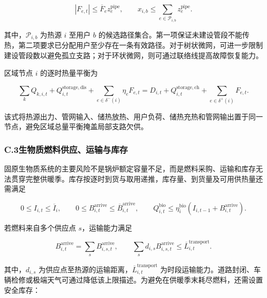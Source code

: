 \begin{equation}
|F_{e,t}|\leq\overline F_ez_e^{\mathrm{pipe}},
\qquad
x_{i,b}\leq\sum_{e\in\mathcal P_{i,b}}z_e^{\mathrm{pipe}}.
\label{eq:guyuan_connectivity}
\end{equation}

其中，$\mathcal P_{i,b}$ 为热源 $i$ 至用户 $b$ 的候选路径集合。第一项保证未建设管段不能传热，第二项要求已分配用户至少存在一条有效路径。对于树状微网，可进一步限制建设管段数以避免孤立支路；对于环状微网，则可通过联络线提高故障恢复能力。

区域节点 $i$ 的逐时热量平衡为

\begin{equation}
\sum_kQ_{k,i,t}+Q_{i,t}^{\mathrm{storage,dis}}
+\sum_{e\in\delta^-(i)}\eta_eF_{e,t}
=D_{i,t}+Q_{i,t}^{\mathrm{storage,ch}}+\sum_{e\in\delta^+(i)}F_{e,t}.
\label{eq:guyuan_node_balance}
\end{equation}

该式将热源出力、管网输入、储热放热、用户负荷、储热充热和管网输出置于同一节点，避免区域总量平衡掩盖局部支路欠供。

\subsubsection*{C.3\quad 生物质燃料供应、运输与库存}

固原生物质系统的主要风险不是锅炉额定容量不足，而是燃料采购、运输和库存无法贯穿完整供暖季。库存按逐时到货与取用递推，库存量、到货量及可用供热量还需满足

\begin{equation}
0\leq I_{i,t}\leq\overline I_i,
\qquad
0\leq B_{i,t}^{\mathrm{arrive}}\leq\overline B_{i,t}^{\mathrm{arrive}},
\qquad
Q_{i,t}^{\mathrm{bio}}\leq\eta_i^{\mathrm{bio}}(I_{i,t-1}+B_{i,t}^{\mathrm{arrive}}).
\label{eq:biomass_limit}
\end{equation}

若燃料来自多个供应点 $s$，运输能力满足

\begin{equation}
B_{i,t}^{\mathrm{arrive}}=\sum_sB_{i,s,t}^{\mathrm{arrive}},
\qquad
\sum_s d_{i,s}B_{i,s,t}^{\mathrm{arrive}}\leq\overline L_{i,t}^{\mathrm{transport}}.
\label{eq:biomass_transport}
\end{equation}

其中，$d_{i,s}$ 为供应点至热源的运输距离，$\overline L_{i,t}^{\mathrm{transport}}$ 为时段运输能力。道路封闭、车辆检修或极端天气可通过降低该上限描述。为避免在供暖季末耗尽燃料，还需设置安全库存：


